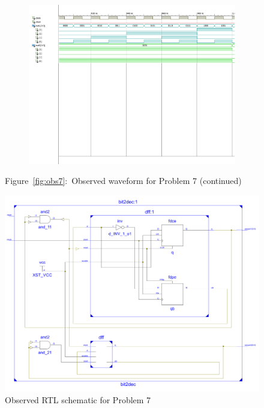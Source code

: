 \documentclass{lab_sheet}
\begin{document}
    \begin{figure}[H]\ContinuedFloat
        \centering
            \begin{subfigure}{\linewidth}
            \includegraphics[width=.95\linewidth, frame]{../Figures/7-10.pdf}
        \caption{}
        \label{fig:obs7-10}
        \end{subfigure}
        \caption*{Figure~\ref{fig:obs7}:~Observed waveform for Problem 7 (continued)}
    \end{figure}
    \begin{figure}[H]
        \centering
        \includegraphics[scale=0.5]{../Figures/q7_ckt.pdf}
        \caption{Observed RTL schematic for Problem 7}
        \label{fig:rtl7}
    \end{figure}
\end{document}
